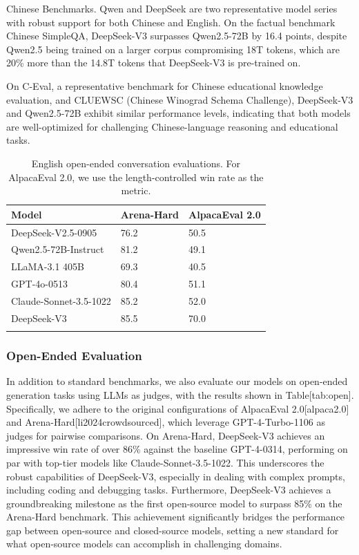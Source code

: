 \documentclass[11pt,a4paper]{article}
\begin{document}
Chinese Benchmarks. Qwen and DeepSeek are two representative model series with robust support for both Chinese and English. On the factual benchmark Chinese SimpleQA, DeepSeek-V3 surpasses Qwen2.5-72B by 16.4 points, despite Qwen2.5 being trained on a larger corpus compromising 18T tokens, which are 20\% more than the 14.8T tokens that DeepSeek-V3 is pre-trained on.

On C-Eval, a representative benchmark for Chinese educational knowledge evaluation, and CLUEWSC (Chinese Winograd Schema Challenge), DeepSeek-V3 and Qwen2.5-72B exhibit similar performance levels, indicating that both models are well-optimized for challenging Chinese-language reasoning and educational tasks.

\begin{table}[h]
\caption{English open-ended conversation evaluations. For AlpacaEval 2.0, we use the length-controlled win rate as the metric.}
\begin{tabular}{|l|l|l|}
\hline
Model & Arena-Hard & AlpacaEval 2.0 \\ \hline
DeepSeek-V2.5-0905 & 76.2 & 50.5 \\ \hline
Qwen2.5-72B-Instruct & 81.2 & 49.1 \\ \hline
LLaMA-3.1 405B & 69.3 & 40.5 \\ \hline
GPT-4o-0513 & 80.4 & 51.1 \\ \hline
Claude-Sonnet-3.5-1022 & 85.2 & 52.0 \\ \hline
DeepSeek-V3 & 85.5 & 70.0 \\ \hline
 &  &  \\ \hline
\end{tabular}
\end{table}

\subsubsection{Open-Ended Evaluation}

In addition to standard benchmarks, we also evaluate our models on open-ended generation tasks using LLMs as judges, with the results shown in Table[tab:open]. Specifically, we adhere to the original configurations of AlpacaEval 2.0[alpaca2.0] and Arena-Hard[li2024crowdsourced], which leverage GPT-4-Turbo-1106 as judges for pairwise comparisons. On Arena-Hard, DeepSeek-V3 achieves an impressive win rate of over 86\% against the baseline GPT-4-0314, performing on par with top-tier models like Claude-Sonnet-3.5-1022. This underscores the robust capabilities of DeepSeek-V3, especially in dealing with complex prompts, including coding and debugging tasks. Furthermore, DeepSeek-V3 achieves a groundbreaking milestone as the first open-source model to surpass 85\% on the Arena-Hard benchmark. This achievement significantly bridges the performance gap between open-source and closed-source models, setting a new standard for what open-source models can accomplish in challenging domains.
\end{document}

